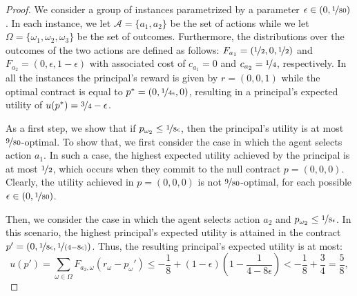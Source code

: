 \spacehardness*	
\begin{proof}
		We consider a group of instances parametrized by a parameter $\epsilon \in \left(0, \nicefrac{1}{80}\right)$. In each instance, we let $\mathcal{A}=\{a_1, a_2\}$ be the set of actions while we let  $\Omega=\{\omega_1, \omega_2, \omega_3\}$ be the set of outcomes. Furthermore, the distributions over the outcomes of the two actions are defined as follows: \(F_{a_1}=\left(\nicefrac{1}{2}, 0, \nicefrac{1}{2}\right)\)  and \(F_{a_2}=\left(0, \epsilon, 1- \epsilon\right)\) with associated cost of \(c_{a_1}=0\) and \(c_{a_2}=\nicefrac{1}{4}\), respectively. In all the instances the principal's reward is given by $r=(0,0,1)$ while the optimal contract is equal to $p^*=(0,\nicefrac{1}{4\epsilon}, 0)$, resulting in a principal's expected utility of $u(p^*)=\nicefrac{3}{4}-\epsilon$. 
		
		
		As a first step, we show that if $p_{\omega_2} \leq \nicefrac{1}{8\epsilon}$, then the principal's utility is at most $\nicefrac{9}{80}$-optimal. To show that, we first consider the case in which the agent selects action $a_1$. In such a case, the highest expected utility achieved by the principal is at most $\nicefrac{1}{2}$, which occurs when they commit to the null contract $p = (0,0,0)$. Clearly, the utility achieved in $p = (0,0,0)$ is not $\nicefrac{9}{80}$-optimal, for each possible $\epsilon \in (0, \nicefrac{1}{80})$.
		
		Then, we consider the case in which the agent selects action $a_2$ and $p_{\omega_2} \leq \nicefrac{1}{8\epsilon}$. In this scenario, the highest principal's expected utility is attained in the contract $p'=(0, \nicefrac{1}{8\epsilon}, \nicefrac{1}{(4- 8\epsilon)})$. Thus, the resulting principal's expected utility is at most:
		\begin{equation*}
			u(p')  = \sum_{\omega \in \Omega} F_{a_2,\omega}(r_\omega-p_\omega') \le -\frac{1}{8} + (1 - \epsilon) \left( 1 - \frac{1}{4-8\epsilon} \right)  < -\frac{1}{8} + \frac{3}{4} = \frac{5}{8},
		\end{equation*}


\end{proof}
